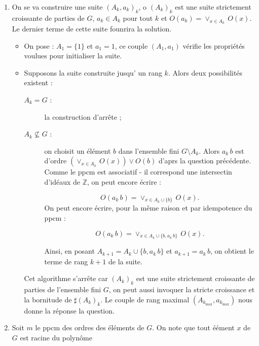 \begin{sol}
\begin{enumerate}
\item\label{seq_Aa_oppcm} On se va construire une suite \((A_k, a_k)_k\), o \((A_k)_k\) est une suite strictement croissante de parties de \(G\), %
\(a_k\in A_k\) pour tout \(k\) et \(O(a_k)=\vee_{x\in A_k} \, O(x)\). %
Le dernier terme de cette suite founrira la solution.

\begin{itemize}
\item %
On pose : \(A_1=\{1\}\) et \(a_1=1\), %
ce couple \((A_1, a_1)\) v\'erifie les propri\'et\'es voulues pour initialiser la suite.

\item Supposons la suite construite jusqu' un rang \(k\). %
Alors deux possibilit\'es existent :

\begin{description}
\item [\(A_k=G\) :] la construction d'arr\^ete ;
\item [\(A_k \nsubseteq G\) :] on choisit un \'el\'ement \(b\) dans l'ensemble fini \(G \setminus A_k\). %
Alors \(a_k \, b\) est d'ordre \(\left(\vee_{x\in A_k} \, O(x)\right) \vee O(b)\) d'aprs la question pr\'ec\'edente. %
Comme le ppcm est associatif - il correspond  une intersectin d'id\'eaux de \(\mathbb{Z}\), %
on peut encore \'ecrire :

\begin{equation}
O(a_k\, b) = \vee_{x\in A_k \cup \{b\}} \, O(x).
\label{}
\end{equation}
On peut encore \'ecrire, pour la m\^eme raison et par idempotence du ppcm :

\begin{equation}
O(a_k\, b) = \vee_{x\in A_k \cup \{b, a_k\,b\}} \, O(x).
\label{}
\end{equation}

Ainsi, en posant \(A_{k+1} = A_k \cup \{b, a_k\,b\}\) et \(a_{k+1}=a_k\, b\), %
on obtient le terme de rang \(k+1\) de la suite.
\end{description}

Cet algorithme s'arr\^ete car \((A_k)_k\) est une suite strictement croissante de parties de l'ensemble fini \(G\), %
on peut aussi invoquer la stricte croissance et la bornitude de \(\sharp (A_k)_k\). %
Le couple de rang maximal \((A_{k_{\max}}, a_{k_{\max}})\) nous donne la r\'eponse  la question.
\end{itemize}

\item Soit \(m\) le ppcm des ordres des \'el\'ements de \(G\). %
On note que tout \'e\'ement \(x\) de \(G\) est racine du polyn\^ome


\end{enumerate}
\end{sol}
